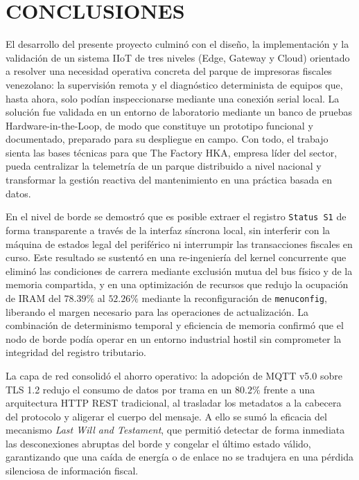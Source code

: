 \chapter*{CONCLUSIONES}

\par El desarrollo del presente proyecto culminó con el diseño, la implementación y la validación de un sistema IIoT de tres niveles (Edge, Gateway y Cloud) orientado a resolver una necesidad operativa concreta del parque de impresoras fiscales venezolano: la supervisión remota y el diagnóstico determinista de equipos que, hasta ahora, solo podían inspeccionarse mediante una conexión serial local. La solución fue validada en un entorno de laboratorio mediante un banco de pruebas Hardware-in-the-Loop, de modo que constituye un prototipo funcional y documentado, preparado para su despliegue en campo. Con todo, el trabajo sienta las bases técnicas para que The Factory HKA, empresa líder del sector, pueda centralizar la telemetría de un parque distribuido a nivel nacional y transformar la gestión reactiva del mantenimiento en una práctica basada en datos.\\

\par En el nivel de borde se demostró que es posible extraer el registro \texttt{Status S1} de forma transparente a través de la interfaz síncrona local, sin interferir con la máquina de estados legal del periférico ni interrumpir las transacciones fiscales en curso. Este resultado se sustentó en una re-ingeniería del kernel concurrente que eliminó las condiciones de carrera mediante exclusión mutua del bus físico y de la memoria compartida, y en una optimización de recursos que redujo la ocupación de IRAM del $78.39\%$ al $52.26\%$ mediante la reconfiguración de \texttt{menuconfig}, liberando el margen necesario para las operaciones de actualización. La combinación de determinismo temporal y eficiencia de memoria confirmó que el nodo de borde podía operar en un entorno industrial hostil sin comprometer la integridad del registro tributario.\\

\par La capa de red consolidó el ahorro operativo: la adopción de MQTT v5.0 sobre TLS 1.2 redujo el consumo de datos por trama en un $80.2\%$ frente a una arquitectura HTTP REST tradicional, al trasladar los metadatos a la cabecera del protocolo y aligerar el cuerpo del mensaje. A ello se sumó la eficacia del mecanismo \textit{Last Will and Testament}, que permitió detectar de forma inmediata las desconexiones abruptas del borde y congelar el último estado válido, garantizando que una caída de energía o de enlace no se tradujera en una pérdida silenciosa de información fiscal.\\

